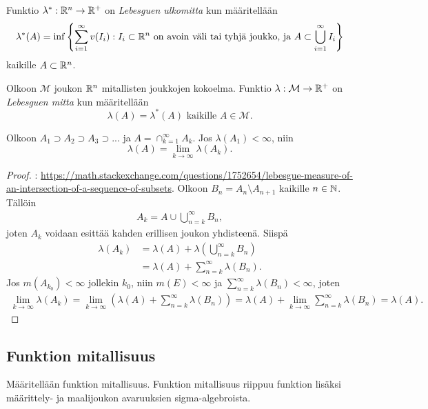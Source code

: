 \documentclass[12pt,oneside,a4paper]{amsbook} %
\begin{document}
\begin{definition}
    Funktio $\lambda^* : \mathbb{R}^n \to \mathbb{R}^+$ on \textit{Lebesguen ulkomitta} kun määritellään
    $$\lambda^*(A) = \inf\left\{\sum_{i=1}^\infty v(I_i) : I_i \subset \mathbb{R}^n \text{ on avoin väli tai tyhjä joukko, ja } A \subset \bigcup_{i=1}^{\infty}I_i\right\}$$
    kaikille $A \subset \mathbb{R}^n$.
\end{definition}

\begin{definition}
    Olkoon $\mathcal M$ joukon $\mathbb{R}^n$ mitallisten joukkojen kokoelma. Funktio $\lambda : \mathcal M \to \mathbb{R}^+$ on \textit{Lebesguen mitta} kun määritellään
    $$\lambda(A) = \lambda^*(A) \text{ kaikille } A \in \mathcal M.$$
\end{definition}

\begin{lemma}\label{le:nestedIntersection}
    Olkoon $A_1 \supset A_2 \supset A_3 \supset ...$ ja $A = \cap_{k=1}^\infty A_k$. Jos $\lambda(A_1) < \infty$, niin 
    \begin{equation*}
        \lambda(A) = \lim_{k\to \infty}\lambda(A_k).
    \end{equation*}
\end{lemma}
\begin{proof} : \url{https://math.stackexchange.com/questions/1752654/lebesgue-measure-of-an-intersection-of-a-sequence-of-subsets}.
    Olkoon $B_n = A_n \setminus A_{n+1}$ kaikille $n \in \mathbb{N}$. Tällöin
    \begin{align*}
        A_k = A \cup \bigcup_{n = k}^\infty B_n,
    \end{align*}
    joten $A_k$ voidaan esittää kahden erillisen joukon yhdisteenä. Siispä
    \begin{align*}
        \lambda(A_k) &= \lambda(A) + \lambda\left(\bigcup_{n = k}^\infty B_n\right) \\
        &= \lambda(A) + \sum_{n = k}^\infty\lambda(B_n).
    \end{align*}
    Jos $m(A_{k_0}) < \infty$ jollekin $k_0$, niin $m(E) < \infty$ ja $\sum_{n = k}^\infty\lambda(B_n) < \infty$, joten 
    \begin{align*}
        \lim_{k\to\infty}\lambda(A_k) = \lim_{k\to\infty}\left(\lambda(A) + \sum_{n = k}^\infty\lambda(B_n)\right) = \lambda(A) + \lim_{k\to\infty}\sum_{n=k}^\infty \lambda(B_n) = \lambda(A).
    \end{align*}
\end{proof}

\subsection{Funktion mitallisuus}
Määritellään funktion mitallisuus. Funktion mitallisuus riippuu funktion lisäksi määrittely- ja maalijoukon avaruuksien sigma-algebroista.
\end{document}
